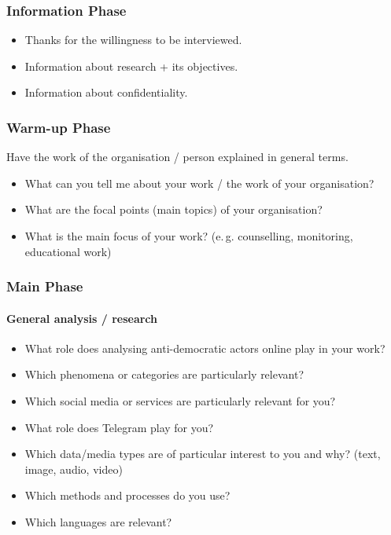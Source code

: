 \documentclass[acmsmall]{acmart}
\begin{document}
\subsubsection{Information Phase}
\begin{itemize}

    \item Thanks for the willingness to be interviewed.
    \item Information about research + its objectives.
    \item Information about confidentiality.
\end{itemize}

\subsubsection{Warm-up Phase}
Have the work of the organisation / person explained in general terms. 
\begin{itemize}

    \item What can you tell me about your work / the work of your organisation? 
    \item What are the focal points (main topics) of your organisation?
    \item What is the main focus of your work? (e.\,g. counselling, monitoring, educational work)
\end{itemize}

\subsubsection{Main Phase}

\paragraph{General analysis / research}

\begin{itemize}
    \item What role does analysing anti-democratic actors online play in your work? 
    \item Which phenomena or categories are particularly relevant? 
    \item Which social media or services are particularly relevant for you?
    \item What role does Telegram play for you? 
    \item Which data/media types are of particular interest to you and why?  (text, image, audio, video)
    \item Which methods and processes do you use?
    \item Which languages are relevant?
\end{itemize}
\end{document}
